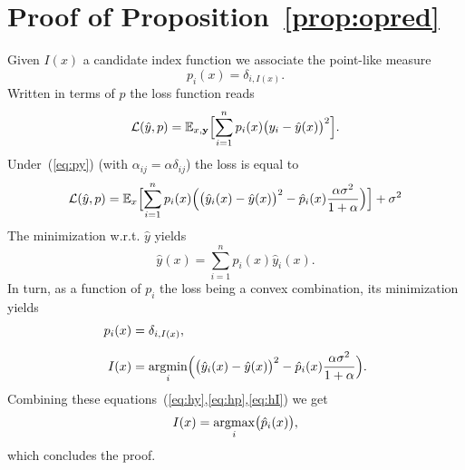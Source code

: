 \chapter{Proof of Proposition~\ref{prop:opred}}\label{app:opred}
Given $I(x)$ a candidate index function we associate the point-like measure
\[
p_i(x) = \delta_{i,I(x)}.
\]
Written in terms of $p$ the loss function reads
\[
{\cal L}(\hat y,p) = {\mathbb E}_{x,{\bf y}}\Bigl[\sum_{i=1}^n p_i(x)\bigl(y_i-\hat y(x)\bigr)^2\Bigr].
\]
Under~(\ref{eq:py}) (with $\alpha_{ij}=\alpha\delta_{ij}$) the loss is equal to
\[
{\cal L}(\hat y,p) = {\mathbb E}_x\Bigl[\sum_{i=1}^n p_i(x)\Bigl( \bigl(\hat y_i(x)-\hat y(x)\bigr)^2-\hat p_i(x)\frac{\alpha\sigma^2}{1+\alpha}\Bigr)\Bigr]+\sigma^2
\]
The minimization w.r.t. $\hat y$ yields
\begin{equation}\label{eq:hy}
\hat y(x) = \sum_{i=1}^n p_i(x)\hat y_i(x).
\end{equation}
In turn, as a function of $p_i$ the loss being a  convex combination, its minimization yields
\begin{align}
  p_i(x) &= \delta_{i,I(x)},\label{eq:hp}\\[0.2cm]
  I(x) &= \operatorname*{argmin}_i\Bigl(\bigl(\hat y_i(x)-\hat y(x)\bigr)^2-\hat p_i(x)\frac{\alpha\sigma^2}{1+\alpha}\Bigr).\label{eq:hI}
\end{align}
Combining these equations~(\ref{eq:hy},\ref{eq:hp},\ref{eq:hI}) we get
\[
I(x) = \operatorname*{argmax}_i\bigl(\hat p_i(x)\bigr),
\]
which concludes the proof.  
